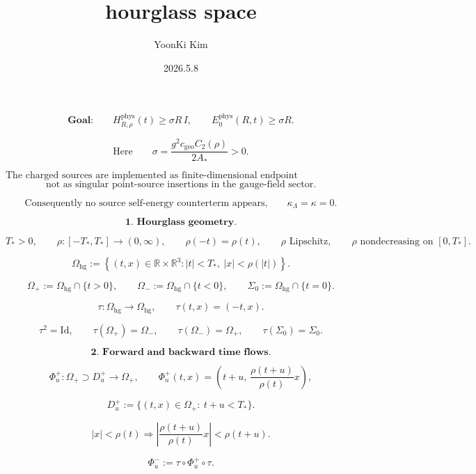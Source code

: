 \documentclass[11pt]{article}
\title{hourglass space}
\author{YoonKi Kim}
\date{2026.5.8}
\begin{document}
\maketitle

\begin{abstract}



\end{abstract}

\[
\textbf{Goal:}
\qquad
H_{R,\rho}^{\mathrm{phys}}(t)
\ge
\sigma R\,I,
\qquad
E_0^{\mathrm{phys}}(R,t)
\ge
\sigma R.
\]

\[
\text{Here}
\qquad
\sigma
=
\frac{g^2c_{\mathrm{geo}}C_2(\rho)}{2A_\ast}
>0.
\]

\[
\text{The charged sources are implemented as finite-dimensional endpoint representation factors,}
\]
\[
\text{not as singular point-source insertions in the gauge-field sector.}
\]

\[
\text{Consequently no source self-energy counterterm appears,}
\qquad
\kappa_\Lambda=\kappa=0.
\]

\bigskip

\[
\textbf{1. Hourglass geometry.}
\]

\[
T_\ast>0,
\qquad
\rho:[-T_\ast,T_\ast]\to(0,\infty),
\qquad
\rho(-t)=\rho(t),
\qquad
\rho \text{ Lipschitz},
\qquad
\rho \text{ nondecreasing on }[0,T_\ast].
\]

\[
\Omega_{\mathrm{hg}}
:=
\left\{
(t,x)\in \mathbb R\times\mathbb R^3:
|t|<T_\ast,\ |x|<\rho(|t|)
\right\}.
\]

\[
\Omega_+:=\Omega_{\mathrm{hg}}\cap\{t>0\},
\qquad
\Omega_-:=\Omega_{\mathrm{hg}}\cap\{t<0\},
\qquad
\Sigma_0:=\Omega_{\mathrm{hg}}\cap\{t=0\}.
\]

\[
\tau:\Omega_{\mathrm{hg}}\to\Omega_{\mathrm{hg}},
\qquad
\tau(t,x)=(-t,x).
\]

\[
\tau^2=\mathrm{Id},
\qquad
\tau(\Omega_+)=\Omega_-,
\qquad
\tau(\Omega_-)=\Omega_+,
\qquad
\tau(\Sigma_0)=\Sigma_0.
\]

\bigskip

\[
\textbf{2. Forward and backward time flows.}
\]

\[
\Phi_u^+:\Omega_+\supset D_u^+\to\Omega_+,
\qquad
\Phi_u^+(t,x)
=
\left(
t+u,\,
\frac{\rho(t+u)}{\rho(t)}x
\right),
\]

\[
D_u^+
:=
\{(t,x)\in\Omega_+:\ t+u<T_\ast\}.
\]

\[
|x|<\rho(t)
\Longrightarrow
\left|
\frac{\rho(t+u)}{\rho(t)}x
\right|
<
\rho(t+u).
\]

\[
\Phi_u^-:=\tau\circ\Phi_u^+\circ\tau.
\]
\end{document}

